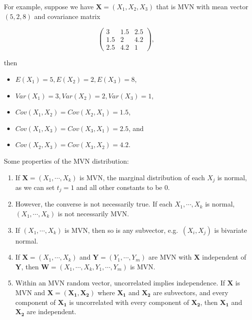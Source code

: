\documentclass[
]{book}
\providecommand{\tightlist}{%
  \setlength{\itemsep}{0pt}\setlength{\parskip}{0pt}}
\begin{document}
For example, suppose we have \(\boldsymbol{X} = (X_1, X_2, X_3)\) that is MVN with mean vector \((5, 2, 8)\) and covariance matrix

\[
\begin{pmatrix}
3 & 1.5 & 2.5\\
1.5 & 2 & 4.2 \\
2.5 & 4.2 & 1
\end{pmatrix},
\]

then

\begin{itemize}
\tightlist
\item
  \(E(X_1) = 5, E(X_2) = 2, E(X_3) = 8\),
\item
  \(Var(X_1) = 3, Var(X_2) = 2, Var(X_3) = 1\),
\item
  \(Cov(X_1, X_2) = Cov(X_2, X_1) = 1.5\),
\item
  \(Cov(X_1, X_3) = Cov(X_3, X_1) = 2.5\), and
\item
  \(Cov(X_2, X_3) = Cov(X_3, X_2) = 4.2\).
\end{itemize}

Some properties of the MVN distribution:

\begin{enumerate}
\def\labelenumi{\arabic{enumi}.}
\item
  If \(\boldsymbol{X} = (X_1, \cdots, X_k)\) is MVN, the marginal distribution of each \(X_j\) is normal, as we can set \(t_j =1\) and all other constants to be 0.
\item
  However, the converse is not necessarily true. If each \(X_1, \cdots, X_k\) is normal, \((X_1, \cdots, X_k)\) is not necessarily MVN.
\item
  If \((X_1, \cdots, X_k)\) is MVN, then so is any subvector, e.g.~\((X_i, X_j)\) is bivariate normal.
\item
  If \(\boldsymbol{X} = (X_1, \cdots, X_k)\) and \(\boldsymbol{Y} = (Y_1, \cdots, Y_m)\) are MVN with \(\boldsymbol{X}\) independent of \(\boldsymbol{Y}\), then \(\boldsymbol{W} = (X_1, \cdots, X_k, Y_1, \cdots, Y_m)\) is MVN.
\item
  Within an MVN random vector, uncorrelated implies independence. If \(\boldsymbol{X}\) is MVN and \(\boldsymbol{X} = (\boldsymbol{X_1, X_2})\) where \(\boldsymbol{X_1}\) and \(\boldsymbol{X_2}\) are subvectors, and every component of \(\boldsymbol{X_1}\) is uncorrelated with every component of \(\boldsymbol{X_2}\), then \(\boldsymbol{X_1}\) and \(\boldsymbol{X_2}\) are independent.
\end{enumerate}
\end{document}
